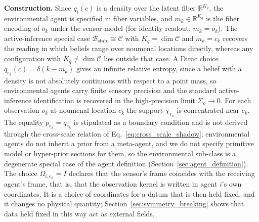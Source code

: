 \documentclass[11pt]{article}
\begin{document}
\textbf{Construction.} Since $q_i(c)$ is a density over the latent fiber $\mathbb{R}^{K_q}$, the environmental agent is specified in fiber variables, and $m_k \in \mathbb{R}^{K_q}$ is the fiber encoding of $o_k$ under the sensor model (for identity readout, $m_k = o_k$). The active-inference special case $\mathcal{B}_{\mathrm{state}} \cong \mathcal{C}$ with $K_q = \dim\mathcal{C}$ and $m_k = c_k$ recovers the reading in which beliefs range over noumenal locations directly, whereas any configuration with $K_q \ne \dim\mathcal{C}$ lies outside that case. A Dirac choice $q_{e_k}(c) = \delta(k - m_k)$ gives an infinite relative entropy, since a belief with a density is not absolutely continuous with respect to a point mass, so environmental agents carry finite sensory precision and the standard active-inference identification is recovered in the high-precision limit $\Sigma_o \to 0$. For each observation $o_k$ at noumenal location $c_k$ the support $\chi_{e_k}$ is concentrated near $c_k$. The equality $p_{e_k} = q_{e_k}$ is stipulated as a boundary condition and is not derived through the cross-scale relation of Eq.~\eqref{eq:cross_scale_shadow}; environmental agents do not inherit a prior from a meta-agent, and we do not specify primitive model or hyper-prior sections for them, so the environmental sub-class is a degenerate special case of the agent definition (Section~\ref{sec:agent_definition}). The choice $\Omega_{i,e_k} = I$ declares that the sensor's frame coincides with the receiving agent's frame, that is, that the observation kernel is written in agent $i$'s own coordinates. It is a choice of coordinates for a datum that is then held fixed, and it changes no physical quantity; Section~\ref{sec:symmetry_breaking} shows that data held fixed in this way act as external fields.
\end{document}
